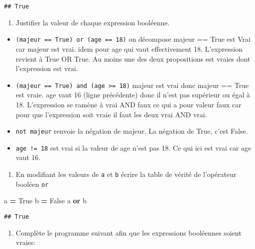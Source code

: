 \documentclass[
]{book}
\newenvironment{Shaded}{\begin{snugshade}}{\end{snugshade}}
\newcommand{\KeywordTok}[1]{\textcolor[rgb]{0.13,0.29,0.53}{\textbf{#1}}}
\newcommand{\NormalTok}[1]{#1}
\newcommand{\OperatorTok}[1]{\textcolor[rgb]{0.81,0.36,0.00}{\textbf{#1}}}
\newcommand{\VariableTok}[1]{\textcolor[rgb]{0.00,0.00,0.00}{#1}}
\providecommand{\tightlist}{%
  \setlength{\itemsep}{0pt}\setlength{\parskip}{0pt}}
\def\tightlist{}
\begin{document}
\begin{verbatim}
## True
\end{verbatim}

\begin{enumerate}
\def\labelenumi{\arabic{enumi}.}
\setcounter{enumi}{1}
\tightlist
\item
  Justifier la valeur de chaque expression booléenne.
\end{enumerate}

\begin{itemize}
\tightlist
\item
  \texttt{(majeur\ ==\ True)\ or\ (age\ ==\ 18)} on décompose majeur == True est Vrai car majeur est vrai. idem pour age qui vaut effectivement 18. L'expression revient à True OR True. Au moins une des deux propositions est vraies dont l'expression est vrai.
\item
  \texttt{(majeur\ ==\ True)\ and\ (age\ \textgreater{}=\ 18)} majeur est vrai donc majeur == True est vraie. age vaut 16 (ligne précédente) donc il n'est pas supérieur ou égal à 18. L'expression se ramène à vrai AND faux ce qui a pour valeur faux car pour que l'expression soit vraie il faut les deux vrai AND vrai.
\item
  \texttt{not\ majeur} renvoie la négation de majeur. La négation de True, c'est False.
\item
  \texttt{age\ !=\ 18} est vrai si la valeur de age n'est pas 18. Ce qui ici est vrai car age vaut 16.
\end{itemize}

\begin{enumerate}
\def\labelenumi{\arabic{enumi}.}
\setcounter{enumi}{2}
\tightlist
\item
  En modifiant les valeurs de \texttt{a} et \texttt{b} écrire la table de vérité de l'opérateur booléen \texttt{or}
\end{enumerate}

\begin{Shaded}
\begin{Highlighting}[]
\NormalTok{a }\OperatorTok{=} \VariableTok{True}
\NormalTok{b }\OperatorTok{=} \VariableTok{False}
\NormalTok{a }\KeywordTok{or}\NormalTok{ b}
\end{Highlighting}
\end{Shaded}

\begin{verbatim}
## True
\end{verbatim}

\begin{enumerate}
\def\labelenumi{\arabic{enumi}.}
\setcounter{enumi}{2}
\tightlist
\item
  Complète le programme suivant afin que les expressions booléennes soient vraies:
\end{enumerate}
\end{document}
